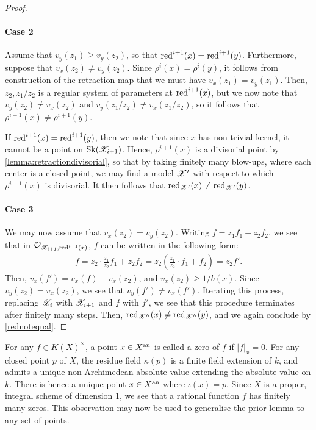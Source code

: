 \begin{proof}
    \paragraph{Case 2}
    
    Assume that $v_y(z_1) \geq v_y(z_2)$, so that $\operatorname{red}^{i + 1}(x) = \operatorname{red}^{i + 1}(y)$.
    Furthermore, suppose that $v_x(z_2) \neq v_y(z_2)$.
    Since $\rho^{i}(x) = \rho^{i}(y)$, it follows from construction of the retraction map that we must have $v_x(z_1) = v_y(z_1)$.
    Then, $z_2, z_1/z_2$ is a regular system of parameters at $\operatorname{red}^{i+1}(x)$, but we now note that $v_y(z_2) \neq v_x(z_2)$ and $v_y(z_1/z_2) \neq v_x(z_1/z_2)$, so it follows that $\rho^{i + 1}(x) \neq \rho^{i + 1}(y)$.
    
    If $\operatorname{red}^{i + 1}(x) = \operatorname{red}^{i + 1}(y)$, then we note that since $x$ has non-trivial kernel, it cannot be a point on $\operatorname{Sk}(\mathscr{X}_{i + 1})$.
    Hence, $\rho^{i + 1}(x)$ is a divisorial point by \cref{lemma:retractiondivisorial}, so that by taking finitely many blow-ups, where each center is a closed point, we may find a model $\mathscr{X}'$ with respect to which $\rho^{i + 1}(x)$  is divisorial.
    It then follows that $\operatorname{red}_{\mathscr{X}'}(x) \neq \operatorname{red}_{\mathscr{X}'}(y)$.
    
    \paragraph{Case 3}
    
    We may now assume that $v_x(z_2) = v_y(z_2)$.
    Writing  $f = z_1 f_1 + z_2 f_2$, we see that in $\mathcal{O}_{\mathscr{X}_{i + 1}, \operatorname{red}^{i + 1}(x)}$, $f$ can be written in the following form:
    \begin{align*}
        f = z_2 \cdot \frac{z_1}{z_2} f_1 + z_2 f_2 = z_2 \left( \frac{z_1}{z_2} \cdot f_1 + f_2 \right) = z_2 f'.
    \end{align*}
    Then, $v_x(f') = v_x(f) - v_x(z_2)$, and $v_x(z_2) \geq 1/b(x)$.
    Since $v_y(z_2) = v_x(z_2)$, we see that $v_y(f') \neq v_x(f')$.
    Iterating this process, replacing $\mathscr{X}_i$ with $\mathscr{X}_{i + 1}$ and $f$ with $f'$, we see that this procedure terminates after finitely many steps.
    Then, $\operatorname{red}_{\mathscr{X}''}(x) \neq \operatorname{red}_{\mathscr{X}''}(y)$, and we again conclude by \cref{rednotequal}.
\end{proof}

For any $f \in K(X)^{\times}$, a point $x \in X^{\text{an}}$ is called a zero of $f$ if $|f|_x = 0$.
For any closed point $p$ of $X$, the residue field $\kappa(p)$ is a finite field extension of $k$, and admits a unique non-Archimedean absolute value extending the absolute value on $k$.
There is hence a unique point $x \in X^{\text{an}}$ where $\iota(x) = p$.
Since $X$ is a proper, integral scheme of dimension $1$, we see that a rational function $f$ has finitely many zeros. 
This observation may now be used to generalise the prior lemma to any set of points.

